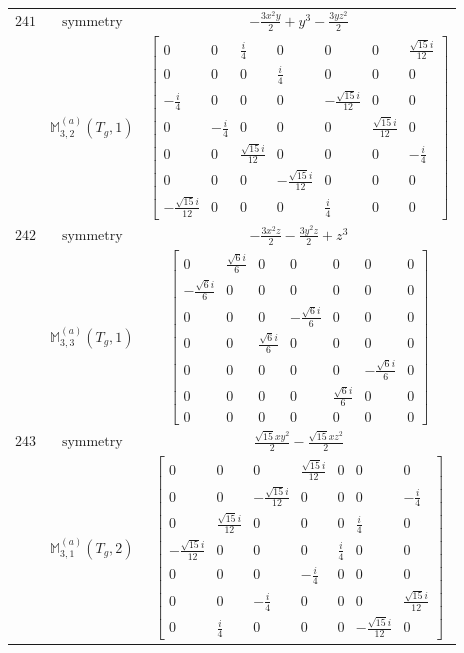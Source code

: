 \documentclass[fleqn,8pt,landscape]{jsarticle}
\begin{document}
\begin{longtable}{ccc}
$ 241 $ & $ \text{symmetry} $ & $ - \frac{3 x^{2} y}{2} + y^{3} - \frac{3 y z^{2}}{2} $ \\
$  $ & $ \mathbb{M}_{3,2}^{(a)}(T_{g},1) $ & $ \begin{bmatrix} 0 & 0 & \frac{i}{4} & 0 & 0 & 0 & \frac{\sqrt{15} i}{12} \\ 0 & 0 & 0 & \frac{i}{4} & 0 & 0 & 0 \\ - \frac{i}{4} & 0 & 0 & 0 & - \frac{\sqrt{15} i}{12} & 0 & 0 \\ 0 & - \frac{i}{4} & 0 & 0 & 0 & \frac{\sqrt{15} i}{12} & 0 \\ 0 & 0 & \frac{\sqrt{15} i}{12} & 0 & 0 & 0 & - \frac{i}{4} \\ 0 & 0 & 0 & - \frac{\sqrt{15} i}{12} & 0 & 0 & 0 \\ - \frac{\sqrt{15} i}{12} & 0 & 0 & 0 & \frac{i}{4} & 0 & 0 \end{bmatrix} $ \\ \hline
$ 242 $ & $ \text{symmetry} $ & $ - \frac{3 x^{2} z}{2} - \frac{3 y^{2} z}{2} + z^{3} $ \\
$  $ & $ \mathbb{M}_{3,3}^{(a)}(T_{g},1) $ & $ \begin{bmatrix} 0 & \frac{\sqrt{6} i}{6} & 0 & 0 & 0 & 0 & 0 \\ - \frac{\sqrt{6} i}{6} & 0 & 0 & 0 & 0 & 0 & 0 \\ 0 & 0 & 0 & - \frac{\sqrt{6} i}{6} & 0 & 0 & 0 \\ 0 & 0 & \frac{\sqrt{6} i}{6} & 0 & 0 & 0 & 0 \\ 0 & 0 & 0 & 0 & 0 & - \frac{\sqrt{6} i}{6} & 0 \\ 0 & 0 & 0 & 0 & \frac{\sqrt{6} i}{6} & 0 & 0 \\ 0 & 0 & 0 & 0 & 0 & 0 & 0 \end{bmatrix} $ \\ \hline
$ 243 $ & $ \text{symmetry} $ & $ \frac{\sqrt{15} x y^{2}}{2} - \frac{\sqrt{15} x z^{2}}{2} $ \\
$  $ & $ \mathbb{M}_{3,1}^{(a)}(T_{g},2) $ & $ \begin{bmatrix} 0 & 0 & 0 & \frac{\sqrt{15} i}{12} & 0 & 0 & 0 \\ 0 & 0 & - \frac{\sqrt{15} i}{12} & 0 & 0 & 0 & - \frac{i}{4} \\ 0 & \frac{\sqrt{15} i}{12} & 0 & 0 & 0 & \frac{i}{4} & 0 \\ - \frac{\sqrt{15} i}{12} & 0 & 0 & 0 & \frac{i}{4} & 0 & 0 \\ 0 & 0 & 0 & - \frac{i}{4} & 0 & 0 & 0 \\ 0 & 0 & - \frac{i}{4} & 0 & 0 & 0 & \frac{\sqrt{15} i}{12} \\ 0 & \frac{i}{4} & 0 & 0 & 0 & - \frac{\sqrt{15} i}{12} & 0 \end{bmatrix} $ \\ \hline

\end{longtable}
\end{document}
